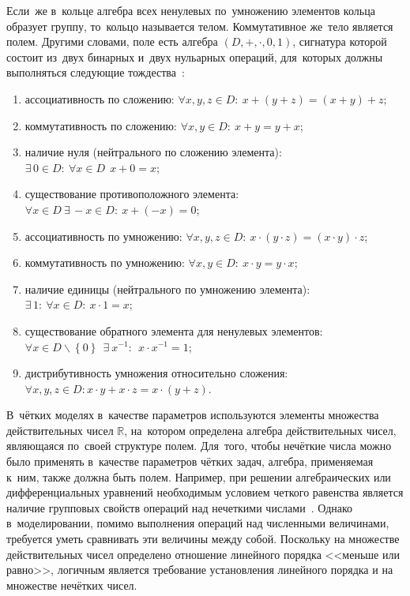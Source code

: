 Если~же в~кольце алгебра всех ненулевых по~умножению элементов кольца образует группу, то~кольцо называется телом. Коммутативное же~тело является полем. Другими словами, поле есть алгебра $\left( D,+,\cdot ,0,1 \right)$, сигнатура которой состоит из~двух бинарных и~двух нульарных операций, для~которых должны выполняться следующие тождества~\cite{Adelson_Velskiy, Bauman_DM, Yakhyaeva}:
\begin{enumerate}
	\item ассоциативность по сложению: $\forall x,y,z\in D:\ x+\left( y+z \right)=\left( x+y \right)+z$;
	\item коммутативность по сложению: $\forall x,y\in D:\ x+y=y+x$;
	\item наличие нуля (нейтрального по сложению элемента): $\exists \,0\in D:\ \forall x\in D\ \ x+0=x$;
	\item существование противоположного элемента:$\forall x\in D\ \exists \,-x\in D:\ x+\left( -x \right)=0$;
	\item ассоциативность по умножению: $\forall x,y,z\in D:\ x\cdot \left( y\cdot z \right)=\left( x\cdot y \right)\cdot z$;
	\item коммутативность по умножению: $\forall x,y\in D:\ x\cdot y=y\cdot x$;
	\item наличие единицы (нейтрального по умножению элемента): $\exists \,1:\ \forall x\in D:\ x\cdot 1=x$;
	\item существование обратного элемента для ненулевых элементов: $\forall x\in D\backslash \left\{ 0 \right\}\ \ \exists \ {{x}^{-1}}:\ \ x\cdot {{x}^{-1}}=1$;
	\item дистрибутивность умножения относительно сложения: $\forall x,y,z\in D:x\cdot y+x\cdot z=x\cdot \left( y+z \right)$.
\end{enumerate}

В~чётких моделях в~качестве параметров используются элементы множества действительных чисел $\mathbb{R}$, на~котором определена алгебра действительных чисел, являющаяся по~своей структуре полем. Для~того, чтобы нечёткие числа можно было применять в~качестве параметров чётких задач, алгебра, применяемая к~ним, также должна быть полем. Например, при решении алгебраических или дифференциальных уравнений необходимым условием четкого равенства является наличие групповых свойств операций над нечеткими числами~\cite{Serbia_Algebras}. Однако в~моделировании, помимо выполнения операций над численными величинами, требуется уметь сравнивать эти величины между собой. Поскольку на множестве действительных чисел определено отношение линейного порядка <<меньше или равно>>, логичным является требование установления линейного порядка и на множестве нечётких чисел.

